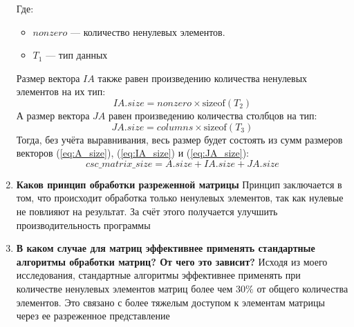 \begin{enumerate}
\begin{equation}
		\label{eq:A_size}
	\end{equation}
	Где:
	\begin{itemize}
		\item $nonzero$ — количество ненулевых элементов.
		\item $T_1$ — тип данных
	\end{itemize}
	\vspace{1.5em}
	Размер вектора $IA$ также равен произведению количества ненулевых элементов на их тип:
	\begin{equation}
		IA.size = nonzero \times \text{sizeof}(T_2)
		\label{eq:IA_size}
	\end{equation}
	А размер вектора $JA$ равен произведению количества столбцов на тип:
	\begin{equation}
		JA.size = columns \times \text{sizeof}(T_3)
		\label{eq:JA_size}
	\end{equation}
	Тогда, без учёта выравнивания, весь размер будет состоять из сумм размеров векторов (\ref{eq:A_size}), (\ref{eq:IA_size}) и (\ref{eq:JA_size}):
	\begin{equation}
		csc\_matrix\_size = A.size + IA.size + JA.size
		\label{eq:csc_matrix_size}
	\end{equation}
	\item \textbf{Каков принцип обработки разреженной матрицы}
	Принцип заключается в том, что происходит обработка только ненулевых элементов, так как нулевые не повлияют на результат. За счёт этого получается улучшить производительность программы
	
	\item \textbf{В каком случае для матриц эффективнее применять стандартные алгоритмы обработки матриц? От чего это зависит?}
	Исходя из моего исследования, стандартные алгоритмы эффективнее применять при количестве ненулевых элементов матриц более чем $30\%$ от общего количества элементов. Это связано с более тяжелым доступом к элементам матрицы через ее разреженное представление 
\end{enumerate}